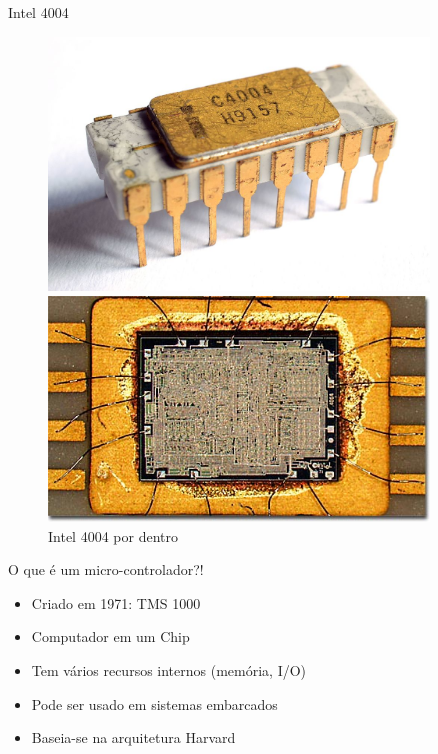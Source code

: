 \documentclass[t]{beamer}
\begin{document}
\begin{frame}{Intel 4004}
	\begin{figure}[ht]
		\begin{minipage}[b]{0.45\linewidth}
			\centering
			\includegraphics[width=0.9\textwidth]{Intel_C4004}
			\caption{Intel 4004 por fora}
		\end{minipage}
		\hspace{0.5cm}
		\begin{minipage}[b]{0.45\linewidth}
			\centering
			\includegraphics[width=0.9\textwidth]{Intel_C4004_die}
			\caption{Intel 4004 por dentro}
		\end{minipage}
	\end{figure}
\end{frame}

\begin{frame}{O que é um micro-controlador?!}
	\begin{itemize}
		\item Criado em 1971: TMS 1000
		\item Computador em um Chip
		\item Tem vários recursos internos (memória, I/O)
		\item Pode ser usado em sistemas embarcados 
		\item Baseia-se na arquitetura Harvard
	\end{itemize}
\end{frame}
\end{document}

